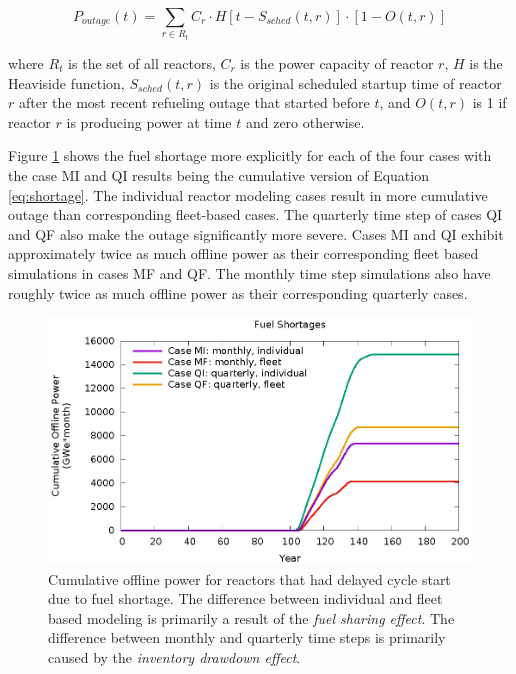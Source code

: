 \documentclass{style}
\begin{document}
\begin{equation}
    P_{outage}(t) = \sum\limits_{r \in R_t} C_r \cdot H[t-S_{sched}(t,r)] \cdot [1-O(t,r)]
    \label{eq:shortage}
\end{equation}

where $R_t$ is the set of all reactors, $C_r$ is the power capacity of reactor
$r$, $H$ is the Heaviside function, $S_{sched}(t,r)$ is the original scheduled
startup time of reactor $r$ after the most recent refueling outage that
started before $t$, and $O(t,r)$ is 1 if reactor $r$ is producing power at
time $t$ and zero otherwise.

Figure \ref{fig:unfueled} shows the fuel shortage more explicitly for each of
the four cases with the case MI and QI results being the cumulative version of
Equation \ref{eq:shortage}.  The individual reactor modeling cases result in
more cumulative outage than corresponding fleet-based cases. The quarterly
time step of cases QI and QF also make the outage significantly more severe.
Cases MI and QI exhibit approximately twice as much offline power as their
corresponding fleet based simulations in cases MF and QF.  The monthly time
step simulations also have roughly twice as much offline power as their
corresponding quarterly cases.

\begin{figure}[!h]
    \centering
    \includegraphics[width=1.0\columnwidth]{exp2/unfueled.eps}
    \caption[Cumulative offline power due to fuel shortage]{
        Cumulative offline power for reactors that had delayed cycle start due
        to fuel shortage. The difference between individual and fleet based
        modeling is primarily a result of the \emph{fuel sharing effect}. The
        difference between monthly and quarterly time steps is primarily
        caused by the \emph{inventory drawdown effect}.
    }
    \label{fig:unfueled}
\end{figure}
\end{document}

